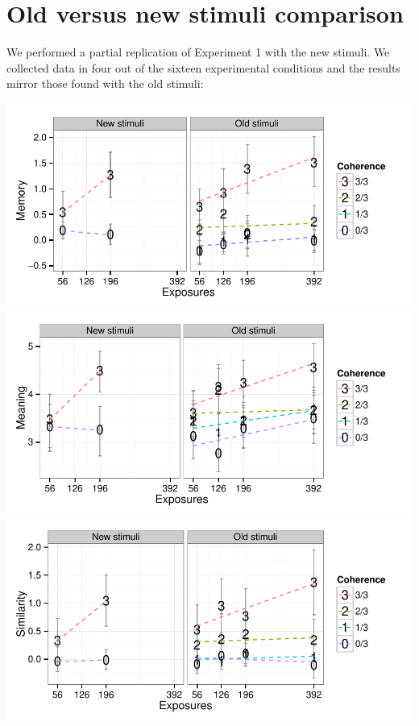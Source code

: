 \documentclass[man,floatsintext]{apa6}
\begin{document}
\newpage



\appendix
\section{Old versus new stimuli comparison}
\label{old-vs-new}

We performed a partial replication of Experiment 1 with the new stimuli. We collected data in four out of the sixteen experimental conditions and the results mirror those found with the old stimuli:

\begin{center}
\includegraphics[width=0.7\linewidth]{stim-comparison-mem} \\

\includegraphics[width=0.7\linewidth]{stim-comparison-mng} \\

\includegraphics[width=0.7\linewidth]{stim-comparison-sim}

\end{center}

\end{document}

